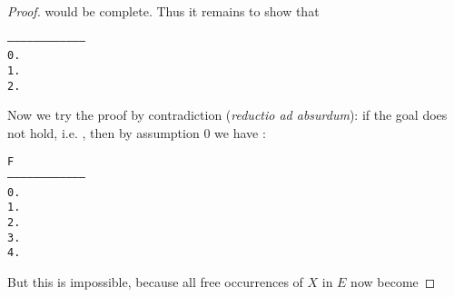 \begin{proof}
would be complete. Thus it remains to show that
\begin{alltt}
   ------------------------------------
    0.  
    1.  
    2.  
\end{alltt}
Now we try the proof by contradiction (\emph{reductio ad absurdum}): if
the goal does not hold, i.e.
, then by assumption 0 we have :
\begin{alltt}
        F
   ------------------------------------
    0.  
    1.  
    2.  
    3.  
    4.  
\end{alltt}
But this is impossible, because all free occurrences of $X$ in $E$ now become

\end{proof}
